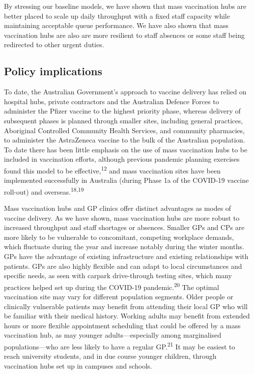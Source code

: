 \documentclass{article}
\begin{document}
By stressing our baseline models, we have shown that mass vaccination
hubs are better placed to scale up daily throughput with a fixed staff
capacity while maintaining acceptable queue performance. We have also
shown that mass vaccination hubs are also are more resilient to staff
absences or some staff being redirected to other urgent duties.

\hypertarget{policy-implications}{%
\subsection{Policy implications}\label{policy-implications}}

To date, the Australian Government's approach to vaccine delivery has
relied on hospital hubs, private contractors and the Australian Defence
Forces to administer the Pfizer vaccine to the highest priority phase,
whereas delivery of subsequent phases is planned through smaller sites,
including general practices, Aboriginal Controlled Community Health
Services, and community pharmacies, to administer the AstraZeneca
vaccine to the bulk of the Australian population. To date there has been
little emphasis on the use of mass vaccination hubs to be included in
vaccination efforts, although previous pandemic planning exercises found
this model to be effective,\textsuperscript{12} and mass vaccination
sites have been implemented successfully in Australia (during Phase 1a
of the COVID-19 vaccine roll-out) and overseas.\textsuperscript{18,19}

Mass vaccination hubs and GP clinics offer distinct advantages as modes
of vaccine delivery. As we have shown, mass vaccination hubs are more
robust to increased throughput and staff shortages or absences. Smaller
GPs and CPs are more likely to be vulnerable to concomitant, competing
workplace demands, which fluctuate during the year and increase notably
during the winter months. GPs have the advantage of existing
infrastructure and existing relationships with patients. GPs are also
highly flexible and can adapt to local circumstances and specific needs,
as seen with carpark drive-through testing sites, which many practices
helped set up during the COVID-19 pandemic.\textsuperscript{20} The
optimal vaccination site may vary for different population segments.
Older people or clinically vulnerable patients may benefit from
attending their local GP who will be familiar with their medical
history. Working adults may benefit from extended hours or more flexible
appointment scheduling that could be offered by a mass vaccination hub,
as may younger adults---especially among marginalised populations---who
are less likely to have a regular GP.\textsuperscript{21} It may be
easiest to reach university students, and in due course younger
children, through vaccination hubs set up in campuses and schools.
\end{document}
